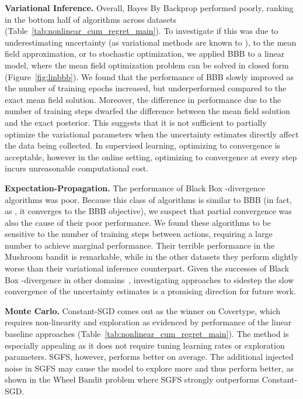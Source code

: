 \documentclass{article} \usepackage{iclr2018_conference,times}
\begin{document}
\textbf{Variational Inference.}
Overall, Bayes By Backprop performed poorly, ranking in the bottom half of algorithms across datasets (Table~\ref{tab:nonlinear_cum_regret_main}). To investigate if this was due to underestimating uncertainty (as variational methods are known to \citep{bishop2006pattern}), to the mean field approximation, or to stochastic optimization, we applied BBB to a linear model, where the mean field optimization problem can be solved in closed form (Figure~\ref{fig:linbbb}). We found that the performance of BBB slowly improved as the number of training epochs increased, but underperformed compared to the exact mean field solution. Moreover, the difference in performance due to the number of training steps dwarfed the difference between the mean field solution and the exact posterior. This suggests that it is not sufficient to partially optimize the variational parameters when the uncertainty estimates directly affect the data being collected. In supervised learning, optimizing to convergence is acceptable, however in the online setting, optimizing to convergence at every step incurs unreasonable computational cost.

\textbf{Expectation-Propagation.}
The performance of Black Box -divergence algorithms was poor. Because this class of algorithms is similar to BBB (in fact, as , it converges to the BBB objective), we suspect that partial convergence was also the cause of their poor performance. We found these algorithms to be sensitive to the number of training steps between actions, requiring a large number to achieve marginal performance. Their terrible performance in the Mushroom bandit is remarkable, while in the other datasets they perform slightly worse than their variational inference counterpart. Given the successes of Black Box -divergence in other domains~\citep{Hernandez-Lobato2016}, investigating approaches to sidestep the slow convergence of the uncertainty estimates is a promising direction for future work.

\textbf{Monte Carlo.}  Constant-SGD comes out as the winner on Covertype, which requires non-linearity and exploration as evidenced by performance of the linear baseline approaches (Table~\ref{tab:nonlinear_cum_regret_main}).  The method is especially appealing as it does not require tuning learning rates or exploration parameters. SGFS, however, performs better on average.  The additional injected noise in SGFS may cause the model to explore more and thus perform better, as shown in the Wheel Bandit problem where SGFS strongly outperforms Constant-SGD.
\end{document}
